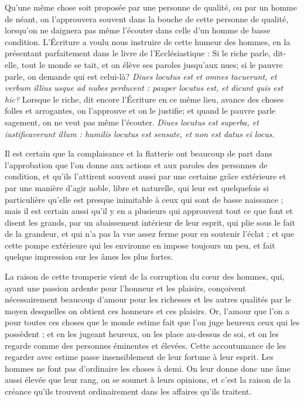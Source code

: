 Qu'une même chose soit proposée par une personne de qualité, ou par un homme de néant, on l'approuvera souvent dans la bouche de cette personne de qualité, lorsqu'on ne daignera pas même l'écouter dans celle d'un homme de basse condition. L'Écriture a voulu nous instruire de cette humeur des hommes, en la présentant parfaitement dans le livre de l'Ecclésiastique : Si le riche parle, dit-elle, tout le monde se tait, et on élève ses paroles jusqu'aux nues; si le pauvre parle, on demande qui est celui-là? \emph{Diues locutus est et omnes tacuerunt, et verbum illius usque ad nubes perducent : pauper locutus est, et dicunt quis est hic?} Lorsque le riche, dit encore l'Écriture en ce même lieu, avance des choses folles et arrogantes, on l'approuve et on le justifie; et quand le pauvre parle sagement, on ne veut pas même l'écouter. \emph{Diues locutus est superba, et iustificaverunt illum : humilis locutus est sensate, et non est datus ei locus}.

Il est certain que la complaisance et la flatterie ont beaucoup de part dans l'approbation que l'on donne aux actions et aux paroles des personnes de condition, et qu'ils l'attirent souvent aussi par une certaine grâce extérieure et par une manière d'agir noble, libre et naturelle, qui leur est quelquefois si particulière qu'elle est presque inimitable à ceux qui sont de basse naissance ; mais il est certain aussi qu'il y en a plusieurs qui approuvent tout ce que font et disent les grands, par un abaissement intérieur de leur esprit, qui plie sous le fait de la grandeur, et qui n'a pas la vue assez ferme pour en soutenir l'éclat ; et que cette pompe extérieure qui les environne en impose toujours un peu, et fait quelque impression sur les âmes les plus fortes.

La raison de cette tromperie vient de la corruption du cœur des hommes, qui, ayant une passion ardente pour l'honneur et les plaisirs, conçoivent nécessairement beaucoup d'amour pour les richesses et les autres qualités par le moyen desquelles on obtient ces honneurs et ces plaisirs. Or, l'amour que l'on a pour toutes ces choses que le monde estime fait que l'on juge heureux ceux qui les possèdent ; et en les jugeant heureux, on les place au-dessus de soi, et on les regarde comme des personnes éminentes et élevées. Cette accoutumance de les regarder avec estime passe insensiblement de leur fortune à leur esprit. Les hommes ne font pas d'ordinaire les choses à demi. On leur donne donc une âme aussi élevée que leur rang, on se soumet à leurs opinions, et c'est la raison de la créance qu'ils trouvent ordinairement dans les affaires qu'ils traitent.

